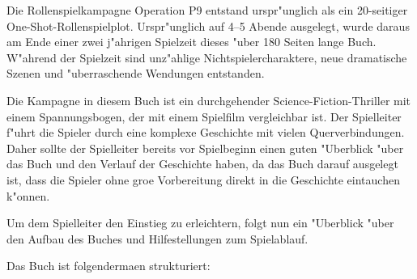
Die Rollenspielkampagne Operation P9 entstand urspr"unglich als ein 20-seitiger One-Shot-\linebreak{}Rollenspielplot. Urspr"unglich auf 
4--5 Abende ausgelegt, wurde daraus am Ende einer zwei j"ahrigen Spielzeit dieses "uber 180 Seiten lange Buch. W"ahrend der Spielzeit sind unz"ahlige Nichtspielercharaktere, neue dramatische Szenen und "uberraschende Wendungen entstanden.

Die Kampagne in diesem Buch ist ein durchgehender Science-Fiction-Thriller mit einem Spannungsbogen, der mit einem Spielfilm vergleichbar ist. Der Spielleiter f"uhrt die Spieler durch eine komplexe Geschichte mit vielen Querverbindungen. Daher sollte der Spielleiter bereits vor Spielbeginn einen guten "Uberblick "uber das Buch und den Verlauf der Geschichte haben, da das Buch darauf ausgelegt ist, dass die Spieler ohne gro\3e Vorbereitung direkt in die Geschichte eintauchen k"onnen.

Um dem Spielleiter den Einstieg zu erleichtern, folgt nun ein "Uberblick "uber den Aufbau des Buches und Hilfestellungen zum Spielablauf.


Das Buch ist folgenderma\3en strukturiert:

